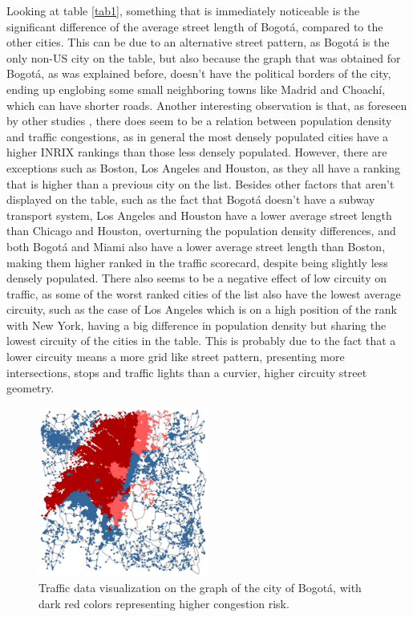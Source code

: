 \documentclass[runningheads]{llncs}
\begin{document}
Looking at table \ref{tab1}, something that is immediately noticeable is the significant difference of the average street length of Bogotá, compared to the other cities. This can be due to an alternative street pattern, as Bogotá is the only non-US city on the table, but also because the graph that was obtained for Bogotá, as was explained before, doesn't have the political borders of the city, ending up englobing some small neighboring towns like Madrid and Choachí, which can have shorter roads. Another interesting observation is that, as foreseen by other studies \cite{levinson_network_2012} \cite{louf_how_2014}, there does seem to be a relation between population density and traffic congestions, as in general the most densely populated cities have a higher INRIX rankings than those less densely populated. However, there are exceptions such as Boston, Los Angeles and Houston, as they all have a ranking that is higher than a previous city on the list. Besides other factors that aren't displayed on the table, such as the fact that Bogotá doesn't have a subway transport system, Los Angeles and Houston have a lower average street length than Chicago and Houston, overturning the population density differences, and both Bogotá and Miami also have a lower average street length than Boston, making them higher ranked in the traffic scorecard, despite being slightly less densely populated. There also seems to be a negative effect of low circuity on traffic, as some of the worst ranked cities of the list also have the lowest average circuity, such as the case of Los Angeles which is on a high position of the rank with New York, having a big difference in population density but sharing the lowest circuity of the cities in the table. This is probably due to the fact that a lower circuity means a more grid like street pattern, presenting more intersections, stops and traffic lights than a curvier, higher circuity street geometry.

\begin{figure}[h]
	\centering
	\includegraphics[width=0.5\textwidth]{Images/GrafoBogotaTrafico}
	\caption{Traffic data visualization on the graph of the city of Bogotá, with dark red colors representing higher congestion risk.}
    \label{fig:Traffic}
\end{figure}
\end{document}
